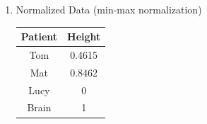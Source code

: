 \documentclass[12pt]{article}
\begin{document}
\begin{enumerate}[1.]
\begin{enumerate}
    \end{enumerate}

    \item Normalized Data (min-max normalization) \newline \\
    \begin{tabular}{|c|c|}
        \hline
        \textbf{Patient} & \textbf{Height} \\ \hline
        Tom & 0.4615 \\
        Mat & 0.8462 \\
        Lucy & 0 \\
        Brain & 1 \\ \hline
    \end{tabular}

\end{enumerate}
\end{document}
